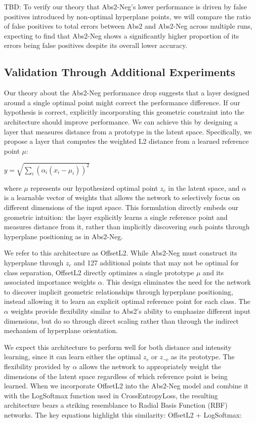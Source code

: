 TBD: To verify our theory that Abs2-Neg's lower performance is driven by false positives introduced by non-optimal hyperplane points, we will compare the ratio of false positives to total errors between Abs2 and Abs2-Neg across multiple runs, expecting to find that Abs2-Neg shows a significantly higher proportion of its errors being false positives despite its overall lower accuracy.

\subsection{Validation Through Additional Experiments}

Our theory about the Abs2-Neg performance drop suggests that a layer designed around a single optimal point might correct the performance difference. If our hypothesis is correct, explicitly incorporating this geometric constraint into the architecture should improve performance. We can achieve this by designing a layer that measures distance from a prototype in the latent space. Specifically, we propose a layer that computes the weighted L2 distance from a learned reference point $\mu$:

$y = \sqrt{\sum_i (\alpha_i(x_i - \mu_i))^2}$

where $\mu$ represents our hypothesized optimal point $z_c$ in the latent space, and $\alpha$ is a learnable vector of weights that allows the network to selectively focus on different dimensions of the input space. This formulation directly embeds our geometric intuition: the layer explicitly learns a single reference point and measures distance from it, rather than implicitly discovering such points through hyperplane positioning as in Abs2-Neg.

We refer to this architecture as OffsetL2. While Abs2-Neg must construct its hyperplane through $z_c$ and 127 additional points that may not be optimal for class separation, OffsetL2 directly optimizes a single prototype $\mu$ and its associated importance weights $\alpha$. This design eliminates the need for the network to discover implicit geometric relationships through hyperplane positioning, instead allowing it to learn an explicit optimal reference point for each class. The $\alpha$ weights provide flexibility similar to Abs2's ability to emphasize different input dimensions, but do so through direct scaling rather than through the indirect mechanism of hyperplane orientation.

We expect this architecture to perform well for both distance and intensity learning, since it can learn either the optimal $z_c$ or $z_{\neg c}$ as its prototype. The flexibility provided by $\alpha$ allows the network to appropriately weight the dimensions of the latent space regardless of which reference point is being learned.
When we incorporate OffsetL2 into the Abs2-Neg model and combine it with the LogSoftmax function used in CrossEntropyLoss, the resulting architecture bears a striking resemblance to Radial Basis Function (RBF) networks. The key equations highlight this similarity:
OffsetL2 + LogSoftmax:

